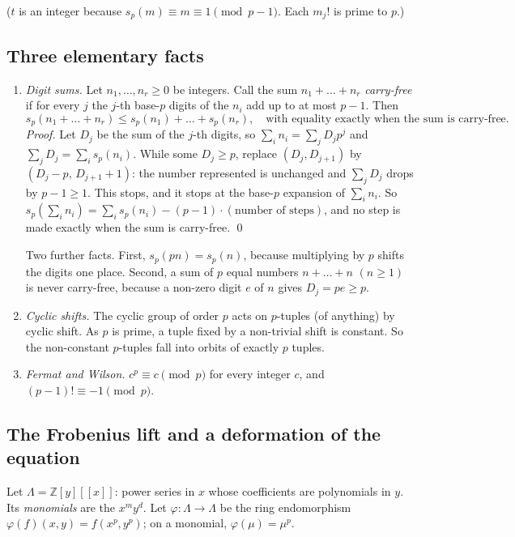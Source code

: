 \documentclass[11pt]{article}
\theoremstyle{definition}
\theoremstyle{remark}
\numberwithin{equation}{section}
\numberwithin{figure}{section}
\newcommand{\Z}{\mathbb Z}
\begin{document}
($t$ is an integer because $s_p(m)\equiv m\equiv1\pmod{p-1}$. Each $m_j!$ is prime to $p$.)

\subsection{Three elementary facts}

\begin{enumerate}[label=\textbf{(E\arabic*)},leftmargin=3.2em]
\item\label{frob:E1} \emph{Digit sums.} Let $n_1,\dots,n_r\ge0$ be integers. Call the sum
$n_1+\dots+n_r$ \emph{carry-free} if for every $j$ the $j$-th base-$p$ digits of the $n_i$
add up to at most $p-1$. Then
\[
 s_p(n_1+\dots+n_r)\le s_p(n_1)+\dots+s_p(n_r),\quad\text{with equality exactly when the sum
 is carry-free.}
\]
\emph{Proof.} Let $D_j$ be the sum of the $j$-th digits, so $\sum_in_i=\sum_jD_jp^j$ and
$\sum_jD_j=\sum_is_p(n_i)$. While some $D_j\ge p$, replace $(D_j,D_{j+1})$ by
$(D_j-p,\,D_{j+1}+1)$: the number represented is unchanged and $\sum_jD_j$ drops by $p-1\ge1$.
This stops, and it stops at the base-$p$ expansion of $\sum_in_i$. So
$s_p(\sum_in_i)=\sum_is_p(n_i)-(p-1)\cdot(\text{number of steps})$, and no step is made
exactly when the sum is carry-free. \qed

Two further facts. First, $s_p(pn)=s_p(n)$, because multiplying by $p$ shifts the digits one
place. Second, a sum of $p$ equal numbers $n+\dots+n$ $(n\ge1)$ is never carry-free, because a
non-zero digit $e$ of $n$ gives $D_j=pe\ge p$.

\item\label{frob:E2} \emph{Cyclic shifts.} The cyclic group of order $p$ acts on $p$-tuples
(of anything) by cyclic shift. As $p$ is prime, a tuple fixed by a non-trivial shift is
constant. So the non-constant $p$-tuples fall into orbits of exactly $p$ tuples.

\item\label{frob:E3} \emph{Fermat and Wilson.} $c^p\equiv c\pmod p$ for every integer $c$, and
$(p-1)!\equiv-1\pmod p$.
\end{enumerate}

\subsection{The Frobenius lift and a deformation of the equation}

Let $\Lambda=\Z[y][[x]]$: power series in $x$ whose coefficients are polynomials in $y$. Its
\emph{monomials} are the $x^my^d$. Let $\varphi\colon\Lambda\to\Lambda$ be the ring
endomorphism $\varphi(f)(x,y)=f(x^p,y^p)$; on a monomial, $\varphi(\mu)=\mu^p$.
\end{document}
